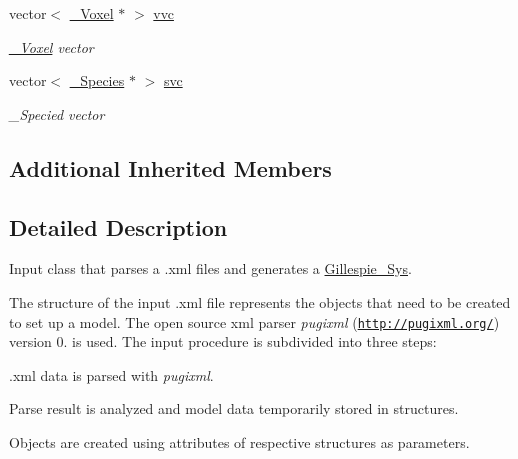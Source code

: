 \begin{DoxyCompactItemize}
vector$<$ \hyperlink{classnw_1_1___voxel}{\+\_\+\+Voxel} $\ast$ $>$ \hyperlink{classnw_1_1_standard___ipt_a7f93dd90e12eb3a5b023e64feca48572}{vvc}
\begin{DoxyCompactList}\small\item\em \hyperlink{classnw_1_1___voxel}{\+\_\+\+Voxel} vector \end{DoxyCompactList}\item 
vector$<$ \hyperlink{classnw_1_1___species}{\+\_\+\+Species} $\ast$ $>$ \hyperlink{classnw_1_1_standard___ipt_a26fbf039d1232349799194d289febb8d}{svc}
\begin{DoxyCompactList}\small\item\em \+\_\+\+Specied vector \end{DoxyCompactList}\end{DoxyCompactItemize}
\subsection*{Additional Inherited Members}


\subsection{Detailed Description}
Input class that parses a .xml files and generates a \hyperlink{classnw_1_1_gillespie___sys}{Gillespie\+\_\+\+Sys}. 

The structure of the input .xml file represents the objects that need to be created to set up a model. The open source xml parser {\itshape pugixml} (\href{http://pugixml.org/}{\tt http\+://pugixml.\+org/}) version 0. is used. The input procedure is subdivided into three steps\+:
\begin{DoxyEnumerate}
\item .xml data is parsed with {\itshape pugixml}.
\item Parse result is analyzed and model data temporarily stored in structures.
\item Objects are created using attributes of respective structures as parameters. 
\end{DoxyEnumerate}

